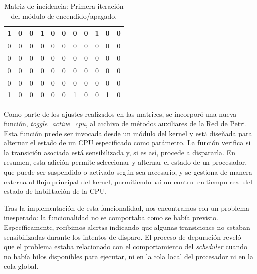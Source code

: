 \begin{table}[H]
    \centering
    \begin{tabular}{|c|c|c|c|c|c|c|c|c|c|c|}
        \hline
        1 & 0 & 0 & 1 & 0 & 0 & 0 & 0 & 1 & \cellcolor{lightgray}0 & \cellcolor{lightgray}0 \\
        \hline
        0 & 0 & 0 & 0 & 0 & 0 & 0 & 0 & 0 & \cellcolor{lightgray}0 & \cellcolor{lightgray}0 \\
        \hline
        0 & 0 & 0 & 0 & 0 & 0 & 0 & 0 & 0 & \cellcolor{lightgray}0 & \cellcolor{lightgray}0 \\
        \hline
        0 & 0 & 0 & 0 & 0 & 0 & 0 & 0 & 0 & \cellcolor{lightgray}0 & \cellcolor{lightgray}0 \\
        \hline
        0 & 0 & 0 & 0 & 0 & 0 & 0 & 0 & 0 & \cellcolor{lightgray}0 & \cellcolor{lightgray}0 \\
        \hline
        \cellcolor{lightgray}1 & \cellcolor{lightgray}0 & \cellcolor{lightgray}0 & \cellcolor{lightgray}0 & \cellcolor{lightgray}0 & \cellcolor{lightgray}0 & \cellcolor{lightgray}1 & \cellcolor{lightgray}0 & \cellcolor{lightgray}0 & \cellcolor{lightgray}1 & \cellcolor{lightgray}0 \\
        \hline
    \end{tabular}
    \caption{Matriz de incidencia: Primera iteración del módulo de encendido/apagado.}
    \label{tabla:matriz_incidencia_post}
\end{table}

Como parte de los ajustes realizados en las matrices, se incorporó una nueva función, \textit{toggle\_active\_cpu}, al archivo de métodos auxiliares de la Red de Petri. Esta función puede ser invocada desde un módulo del kernel y está diseñada para alternar el estado de un CPU especificado como parámetro. La función verifica si la transición asociada está sensibilizada y, si es así, procede a dispararla. En resumen, esta adición permite seleccionar y alternar el estado de un procesador, que puede ser suspendido o activado según sea necesario, y se gestiona de manera externa al flujo principal del kernel, permitiendo así un control en tiempo real del estado de habilitación de la CPU.\par

Tras la implementación de esta funcionalidad, nos encontramos con un problema inesperado: la funcionalidad no se comportaba como se había previsto. Específicamente, recibimos alertas indicando que algunas transiciones no estaban sensibilizadas durante los intentos de disparo. El proceso de depuración reveló que el problema estaba relacionado con el comportamiento del \textit{scheduler} cuando no había hilos disponibles para ejecutar, ni en la cola local del procesador ni en la cola global.


